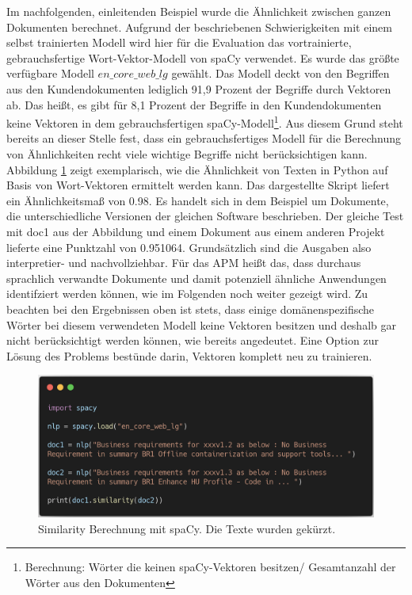 Im nachfolgenden, einleitenden Beispiel wurde die Ähnlichkeit zwischen ganzen Dokumenten berechnet. 
Aufgrund der beschriebenen Schwierigkeiten mit einem selbst trainierten Modell wird hier für die Evaluation das vortrainierte, gebrauchsfertige Wort-Vektor-Modell von spaCy verwendet. Es wurde das größte verfügbare Modell \(en\_core\_web\_lg\) gewählt. Das Modell deckt von den Begriffen aus den Kundendokumenten lediglich 91,9 Prozent der Begriffe durch Vektoren ab. Das heißt, es gibt für 8,1 Prozent der Begriffe in den Kundendokumenten keine Vektoren in dem gebrauchsfertigen spaCy-Modell\footnote{Berechnung: Wörter die keinen spaCy-Vektoren besitzen/ Gesamtanzahl der Wörter aus den Dokumenten}. Aus diesem Grund steht bereits an dieser Stelle fest, dass ein gebrauchsfertiges Modell für die Berechnung von Ähnlichkeiten recht viele wichtige Begriffe nicht berücksichtigen kann. Abbildung \ref{Abbildung:listing_1} zeigt exemplarisch, wie die Ähnlichkeit von Texten in Python auf Basis von Wort-Vektoren ermittelt werden kann. Das dargestellte Skript liefert ein Ähnlichkeitsmaß von 0.98. Es handelt sich in dem Beispiel um Dokumente, die unterschiedliche Versionen der gleichen Software beschrieben. Der gleiche Test mit doc1 aus der Abbildung und einem Dokument aus einem anderen Projekt lieferte eine Punktzahl von 0.951064. Grundsätzlich sind die Ausgaben also interpretier- und nachvollziehbar. Für das APM heißt das, dass durchaus sprachlich verwandte Dokumente und damit potenziell ähnliche Anwendungen identifziert werden können, wie im Folgenden noch weiter gezeigt wird. Zu beachten bei den Ergebnissen oben ist stets, dass einige domänenspezifische Wörter bei diesem verwendeten Modell keine Vektoren besitzen und deshalb gar nicht berücksichtigt werden können, wie bereits angedeutet. Eine Option zur Lösung des Problems bestünde darin, Vektoren komplett neu zu trainieren. 

\begin{figure}[h]
\centering
\includegraphics[scale=0.35]{content/pics/Listing_1_.png}
\caption{Similarity Berechnung mit spaCy. Die Texte wurden gekürzt.}
\label{Abbildung:listing_1}
\end{figure}


